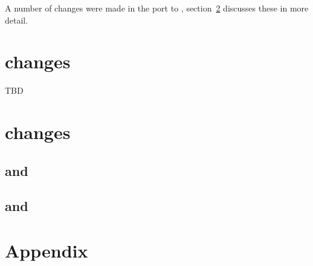 \documentclass[nojss,shortnames,article]{jss}
\begin{document}
A number of changes were made in the port to ,
section~\ref{sec:Cppchanges} discusses these in more detail.

\section[R changes]{ changes}
\label{sec:Rchanges}

TBD

\section[C++ changes]{ changes}
\label{sec:Cppchanges}

\subsection[de4_0.c and deoptim.cpp]{ and }

\subsection[de4_0.c and devol.cpp]{ and }




\section*{Appendix}
\end{document}
